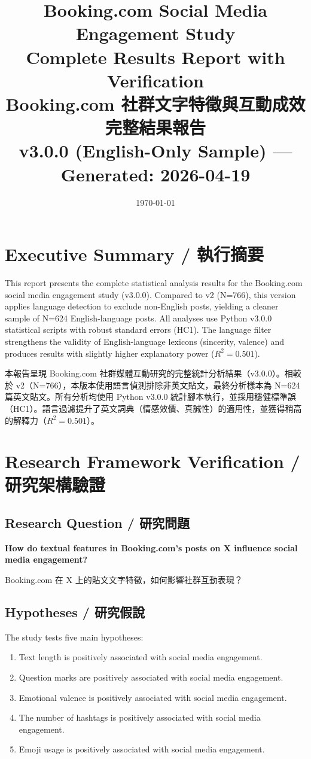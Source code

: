 \documentclass[12pt,a4paper]{article}
\title{Booking.com Social Media Engagement Study\\
Complete Results Report with Verification\\[0.5em]
\large Booking.com 社群文字特徵與互動成效完整結果報告\\[0.5em]
\small v3.0.0 (English-Only Sample) — Generated: 2026-04-19}
\author{}
\date{\today}
\begin{document}
\maketitle
\tableofcontents
\newpage

\section*{Executive Summary / 執行摘要}

This report presents the complete statistical analysis results for the Booking.com social media engagement study (v3.0.0). Compared to v2 (N=766), this version applies language detection to exclude non-English posts, yielding a cleaner sample of N=624 English-language posts. All analyses use Python v3.0.0 statistical scripts with robust standard errors (HC1). The language filter strengthens the validity of English-language lexicons (sincerity, valence) and produces results with slightly higher explanatory power ($R^2 = 0.501$).

本報告呈現 Booking.com 社群媒體互動研究的完整統計分析結果（v3.0.0）。相較於 v2（N=766），本版本使用語言偵測排除非英文貼文，最終分析樣本為 N=624 篇英文貼文。所有分析均使用 Python v3.0.0 統計腳本執行，並採用穩健標準誤（HC1）。語言過濾提升了英文詞典（情感效價、真誠性）的適用性，並獲得稍高的解釋力（$R^2 = 0.501$）。

\section{Research Framework Verification / 研究架構驗證}

\subsection{Research Question / 研究問題}
\textbf{How do textual features in Booking.com's posts on X influence social media engagement?}

Booking.com 在 X 上的貼文文字特徵，如何影響社群互動表現？

\subsection{Hypotheses / 研究假說}

The study tests five main hypotheses:

\begin{enumerate}[label=H\arabic*.]
    \item Text length is positively associated with social media engagement.
    \item Question marks are positively associated with social media engagement.
    \item Emotional valence is positively associated with social media engagement.
    \item The number of hashtags is positively associated with social media engagement.
    \item Emoji usage is positively associated with social media engagement.
\end{enumerate}
\end{document}
